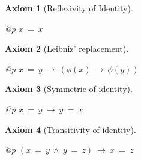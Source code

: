 \documentclass[a4paper,german,10pt,twoside]{book}
\newtheorem{ax}{Axiom}
\theoremstyle{definition}
\theoremstyle{remark}
\begin{document}
\par


\begin{ax}[Reflexivity of Identity]
\label{axiom:identityIsReflexive} \hypertarget{axiom:identityIsReflexive}{}
\mbox{}
\begin{longtable}{{@{\extracolsep{\fill}}p{\linewidth}}}
\centering $x \ =  \ x$
\end{longtable}

\end{ax}




\par


\begin{ax}[Leibniz' replacement]
\label{axiom:leibnizReplacement} \hypertarget{axiom:leibnizReplacement}{}
\mbox{}
\begin{longtable}{{@{\extracolsep{\fill}}p{\linewidth}}}
\centering $x \ =  \ y\ \rightarrow \ (\phi(x)\ \rightarrow \ \phi(y))$
\end{longtable}

\end{ax}




\par


\begin{ax}[Symmetrie of identity]
\label{axiom:symmetryOfIdentity} \hypertarget{axiom:symmetryOfIdentity}{}
\mbox{}
\begin{longtable}{{@{\extracolsep{\fill}}p{\linewidth}}}
\centering $x \ =  \ y\ \rightarrow \ y \ =  \ x$
\end{longtable}

\end{ax}




\par


\begin{ax}[Transitivity of identity]
\label{axiom:transitivityOfIdentity} \hypertarget{axiom:transitivityOfIdentity}{}
\mbox{}
\begin{longtable}{{@{\extracolsep{\fill}}p{\linewidth}}}
\centering $(x \ =  \ y\ \land \ y \ =  \ z)\ \rightarrow \ x \ =  \ z$
\end{longtable}

\end{ax}
\end{document}
